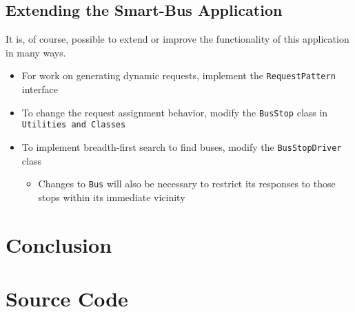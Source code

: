\documentclass[runningheads]{llncs}
\begin{document}
\subsection{Extending the Smart-Bus Application}
It is, of course, possible to extend or improve the functionality of this application in many ways.
\begin{itemize}
	\item For work on generating dynamic requests, implement the \lstinline{RequestPattern} interface 
	\item To change the request assignment behavior, modify the \lstinline{BusStop} class in \lstinline{Utilities and Classes}
	\item To implement breadth-first search to find buses, modify the \lstinline{BusStopDriver} class
	\begin{itemize}
		\item Changes to \lstinline{Bus} will also be necessary to restrict its responses to those stops within its immediate vicinity
	\end{itemize}
\end{itemize}

\section{Conclusion}

\newpage
\appendix
\section{Source Code}

% 
\end{document}
